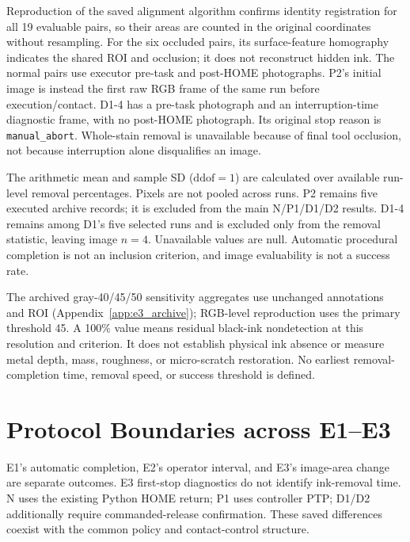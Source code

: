 Reproduction of the saved alignment algorithm confirms identity registration for all 19 evaluable pairs, so their areas are counted in the original coordinates without resampling. For the six occluded pairs, its surface-feature homography indicates the shared ROI and occlusion; it does not reconstruct hidden ink. The normal pairs use executor pre-task and post-HOME photographs. P2's initial image is instead the first raw RGB frame of the same run before execution/contact. D1-4 has a pre-task photograph and an interruption-time diagnostic frame, with no post-HOME photograph. Its original stop reason is \texttt{manual\_abort}. Whole-stain removal is unavailable because of final tool occlusion, not because interruption alone disqualifies an image.

The arithmetic mean and sample SD (\(\mathrm{ddof}=1\)) are calculated over available run-level removal percentages. Pixels are not pooled across runs. P2 remains five executed archive records; it is excluded from the main N/P1/D1/D2 results. D1-4 remains among D1's five selected runs and is excluded only from the removal statistic, leaving image \(n=4\). Unavailable values are null. Automatic procedural completion is not an inclusion criterion, and image evaluability is not a success rate.

The archived gray-40/45/50 sensitivity aggregates use unchanged annotations and ROI (Appendix~\ref{app:e3_archive}); RGB-level reproduction uses the primary threshold 45. A 100\% value means residual black-ink nondetection at this resolution and criterion. It does not establish physical ink absence or measure metal depth, mass, roughness, or micro-scratch restoration. No earliest removal-completion time, removal speed, or success threshold is defined.

\section{Protocol Boundaries across E1--E3}
E1's automatic completion, E2's operator interval, and E3's image-area change are separate outcomes. E3 first-stop diagnostics do not identify ink-removal time. N uses the existing Python HOME return; P1 uses controller PTP; D1/D2 additionally require commanded-release confirmation. These saved differences coexist with the common policy and contact-control structure.
